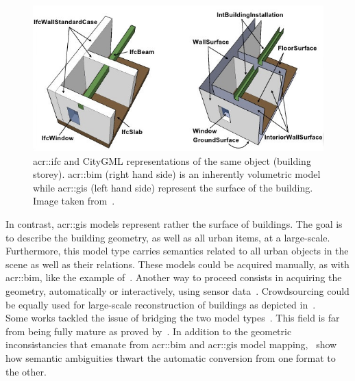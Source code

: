             \begin{figure}[htpb]
                \centering
                \includegraphics[width=\textwidth]{images/introduction/bim_vs_gis}            
                \caption[
                    \acrshort*{acr::ifc} and CityGML representations of the same object (building storey).
                ]{
                    \label{fig::bim_vs_gis}
                    \gls{acr::ifc} and CityGML representations of the same object (building storey).
                    \gls{acr::bim} (right hand side) is an inherently volumetric model while \gls{acr::gis} (left hand side) represent the surface of the building.
                    Image taken from~\parencite{nagel2009conceptual}.
                }
            \end{figure}

            In contrast, \gls{acr::gis} models represent rather the surface of buildings.
            The goal is to describe the building geometry, as well as all urban items, at a large-scale.
            Furthermore, this model type carries semantics related to all urban objects in the scene as well as their relations.
            These models could be acquired manually, as with \gls{acr::bim}, like the example of~\textcite{ref3dnat}.
            Another way to proceed consists in acquiring the geometry, automatically or interactively, using sensor data~\parencite{musialski2013survey}.
            Crowdsourcing could be equally used for large-scale reconstruction of buildings as depicted in~\textcite{uden2013open}.\\

            Some works tackled the issue of bridging the two model types~\parencite{deng2016mapping}.
            This field is far from being fully mature as proved by~\textcite{stoter2018geo}.
            In addition to the geometric inconsistancies that emanate from \gls{acr::bim} and \gls{acr::gis} model mapping,~\textcite{stoter2018geo} show how semantic ambiguities thwart the automatic conversion from one format to the other.\\

